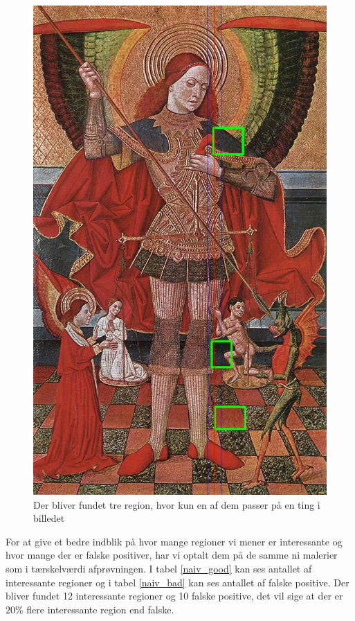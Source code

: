 \begin{figure}[h!!]
	\begin{center}
		\includegraphics[scale=0.3,angle=0]{afsnit/afprovning/billeder/naive_losning/naiv_virker_ikke3.png}
	\end{center}
	\caption[]{Der bliver fundet tre region, hvor kun en af dem passer
	på en ting i billedet}
	\label{naiv_virker_ikke3}
\end{figure}
\clearpage

For at give et bedre indblik på hvor mange regioner vi mener er
interessante og hvor mange der er falske positiver, har vi optalt dem på
de samme ni malerier som i tærskelværdi afprøvningen. I tabel
\ref{naiv_good} kan ses antallet af interessante regioner og i tabel
\ref{naiv_bad} kan ses antallet af falske positive. Der bliver fundet 12
interessante regioner og 10 falske positive, det vil sige at der er $20
\%$ flere interessante region end falske.

